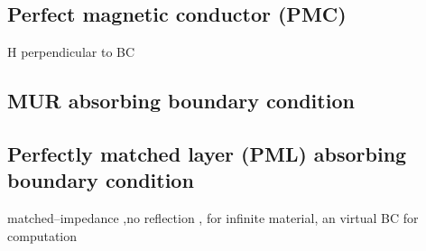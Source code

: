 \subsection{Perfect magnetic conductor (PMC)}\label{subsec:PMC}
H perpendicular to BC

\subsection{MUR absorbing boundary condition}\label{subsec:MUR}

\subsection{Perfectly matched layer (PML) absorbing boundary condition}\label{subsec:PML}
matched--impedance ,no reflection , for infinite  material, an virtual BC for computation

